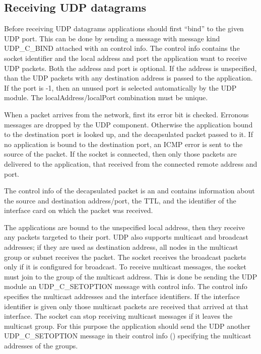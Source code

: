 \subsection{Receiving UDP datagrams}

Before receiving UDP datagrams applications should first ``bind'' to the given UDP port.
This can be done by sending a message with message kind UDP\_C\_BIND attached with an
 control info. The control info contains the socket identifier
and the local address and port the application want to receive UDP packets.
Both the address and port is optional. If the address is unspecified, than the UDP
packets with any destination address is passed to the application. If the port is
-1, then an unused port is selected automatically by the UDP module.
The localAddress/localPort combination must be unique.

When a packet arrives from the network, first its error bit is checked. Erronous messages
are dropped by the UDP component. Otherwise the application bound to the destination port
is looked up, and the decapsulated packet passed to it. If no application is bound to
the destination port, an ICMP error is sent to the source of the packet. If the socket is
connected, then only those packets are delivered to the application, that received from
the connected remote address and port.

The control info of the decapsulated packet is an 
and contains information about the source and destination address/port, the TTL,
and the identifier of the interface card on which the packet was received.

The applications are bound to the unspecified local address, then they receive any packets
targeted to their port. UDP also supports multicast and broadcast addresses; if they
are used as destination address, all nodes in the multicast group or subnet receives the packet.
The socket receives the broadcast packets only if it is configured for broadcast.
To receive multicast messages, the socket must join to the group of the multicast address.
This is done be sending the UDP module an UDP\_C\_SETOPTION message with
 control info. The control info specifies the
multicast addresses and the interface identifiers. If the interface identifier is given
only those multicast packets are received that arrived at that interface.
The socket can stop receiving multicast messages if it leaves the multicast group.
For this purpose the application should send the UDP another UDP\_C\_SETOPTION
message in their control info () specifying
the multicast addresses of the groups.

